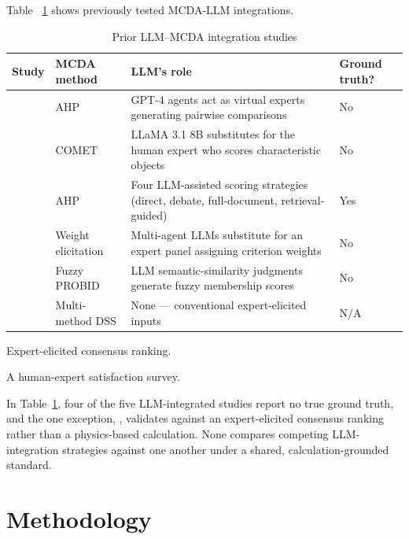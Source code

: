 \documentclass[final,3p,times]{elsarticle}
\begin{document}
Table ~\ref{tab:llm-mcda-prior-work} shows previously tested MCDA-LLM integrations.
\begin{table}[htbp]
\centering
\begin{threeparttable}
\centering
\footnotesize
\begin{tabular}{@{}p{}>{\raggedright\arraybackslash}p{}>{\raggedright\arraybackslash}p{}p{}@{}}
\toprule
\textbf{Study} & \textbf{MCDA method} & \textbf{LLM's role} & \textbf{Ground truth?} \\
\midrule
\cite{svoboda2024} & AHP & GPT-4 agents act as virtual experts generating pairwise comparisons & No \\
\cite{icaart26} & COMET & LLaMA 3.1 8B substitutes for the human expert who scores characteristic objects & No \\
\cite{cheng2026wildfire} & AHP & Four LLM-assisted scoring strategies (direct, debate, full-document, retrieval-guided) & Yes\tnote{a} \\
\cite{vahidnia2025walmas} & Weight elicitation & Multi-agent LLMs substitute for an expert panel assigning criterion weights & No\tnote{b} \\
\cite{anhao2025probid} & Fuzzy PROBID & LLM semantic-similarity judgments generate fuzzy membership scores & No \\
\cite{huangburgherr2024} & Multi-method DSS & None --- conventional expert-elicited inputs & N/A \\
\bottomrule
\end{tabular}
\begin{tablenotes}
\item[a] Expert-elicited consensus ranking.
\item[b] A human-expert satisfaction survey.
\end{tablenotes}
\end{threeparttable}
\caption{Prior LLM--MCDA integration studies}
\label{tab:llm-mcda-prior-work}
\end{table}

\newpage In Table~\ref{tab:llm-mcda-prior-work}, four of the five LLM-integrated studies report no true ground truth, and the one exception, \citet{cheng2026wildfire}, validates against an expert-elicited consensus ranking rather than a physics-based calculation. None compares competing LLM-integration strategies against one another under a shared, calculation-grounded standard.

\section{Methodology}
\label{sec2}
\end{document}
